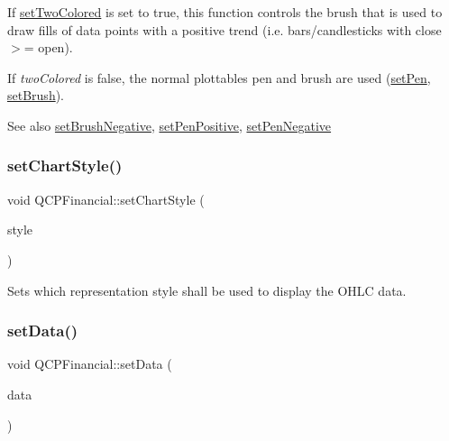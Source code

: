 If \hyperlink{class_q_c_p_financial_a138e44aac160a17a9676652e240c5f08}{set\+Two\+Colored} is set to true, this function controls the brush that is used to draw fills of data points with a positive trend (i.\+e. bars/candlesticks with close $>$= open).

If {\itshape two\+Colored} is false, the normal plottable\textquotesingle{}s pen and brush are used (\hyperlink{class_q_c_p_abstract_plottable_ab74b09ae4c0e7e13142fe4b5bf46cac7}{set\+Pen}, \hyperlink{class_q_c_p_abstract_plottable_a7a4b92144dca6453a1f0f210e27edc74}{set\+Brush}).

\begin{DoxySeeAlso}{See also}
\hyperlink{class_q_c_p_financial_a8bbdd87629f9144b3ef51af660c0961a}{set\+Brush\+Negative}, \hyperlink{class_q_c_p_financial_ac58aa3adc7a35aab0088764b840683e5}{set\+Pen\+Positive}, \hyperlink{class_q_c_p_financial_afe5c07e94ccea01a75b3a2476993c346}{set\+Pen\+Negative} 
\end{DoxySeeAlso}
\mbox{\label{class_q_c_p_financial_a5a59175d36279d71596e64d7bb65596f}} 
\subsubsection{\texorpdfstring{set\+Chart\+Style()}{setChartStyle()}}
{\footnotesize\ttfamily void Q\+C\+P\+Financial\+::set\+Chart\+Style (\begin{DoxyParamCaption}\item[{\hyperlink{class_q_c_p_financial_a0f800e21ee98d646dfc6f8f89d10ebfb}{Q\+C\+P\+Financial\+::\+Chart\+Style}}]{style }\end{DoxyParamCaption})}

Sets which representation style shall be used to display the O\+H\+LC data. \mbox{\label{class_q_c_p_financial_a72089e75b8a50d18097526c3c79fdb85}} 
\subsubsection{\texorpdfstring{set\+Data()}{setData()}\hspace{0.1cm}{\footnotesize\ttfamily [1/2]}}
{\footnotesize\ttfamily void Q\+C\+P\+Financial\+::set\+Data (\begin{DoxyParamCaption}\item[{Q\+Shared\+Pointer$<$ \hyperlink{qcustomplot_8h_ae36e482e04f19a54782f01ab38c354a6}{Q\+C\+P\+Financial\+Data\+Container} $>$}]{data }\end{DoxyParamCaption})}

